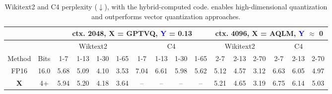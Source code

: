 \begin{table}[t]
\caption{Wikitext2 and C4 perplexity ($\downarrow$), \qts with the hybrid-computed code. \qts enables high-dimensional quantization and outperforms \sota vector quantization approaches.}
\small\sc
\tabcolsep=0.09cm
\centering
\begin{tabular}{@{}cccccccccccccccc@{}}
\multicolumn{1}{l}{}              & \multicolumn{1}{l}{}                              & \multicolumn{8}{c}{ctx. 2048, \textcolor[HTML]{CC0000}{\textbf{X}} = GPTVQ, \textcolor{blue}{\textbf{Y}} = 0.13}                                                                                                                                                                      & \multicolumn{6}{c}{ctx. 4096, \textcolor[HTML]{CC0000}{\textbf{X}} = AQLM, \textcolor{blue}{\textbf{Y}} $\approx$ 0}                                                                                     \\ \midrule
\multicolumn{1}{l}{}              & \multicolumn{1}{l|}{}                             & \multicolumn{4}{c}{Wiktext2}                                                                               & \multicolumn{4}{c|}{C4}                                                                                    & \multicolumn{3}{c}{Wikitext2}                                                              & \multicolumn{3}{c}{C4}                        \\ \midrule
Method                            & \multicolumn{1}{c|}{Bits}                         & 1-7           & 1-13          & 1-30          & \multicolumn{1}{c|}{1-65}                                  & 1-7           & 1-13          & 1-30          & \multicolumn{1}{c|}{1-65}                                  & 2-7           & 2-13          & \multicolumn{1}{c|}{2-70}                                  & 2-7           & 2-13          & 2-70          \\ \midrule
FP16                              & \multicolumn{1}{c|}{16.0}                         & 5.68          & 5.09          & 4.10          & \multicolumn{1}{c|}{3.53}                                  & 7.04          & 6.61          & 5.98          & \multicolumn{1}{c|}{5.62}                                  & 5.12          & 4.57          & \multicolumn{1}{c|}{3.12}                                  & 6.63          & 6.05          & 4.97          \\
\rowcolor[HTML]{D9D9D9} 
{\color[HTML]{CC0000} \textbf{X}} & \multicolumn{1}{c|}{\cellcolor[HTML]{D9D9D9}4+\color{blue}{\textbf{Y}}}  & 5.94          & 5.20          & 4.18          & \multicolumn{1}{c|}{\cellcolor[HTML]{D9D9D9}3.64}          & --            & --            & --            & \multicolumn{1}{c|}{\cellcolor[HTML]{D9D9D9}--}            & 5.21          & 4.65          & \multicolumn{1}{c|}{\cellcolor[HTML]{D9D9D9}3.19}          & 6.75          & 6.14          & 5.03          \\

\end{tabular}
\end{table}
